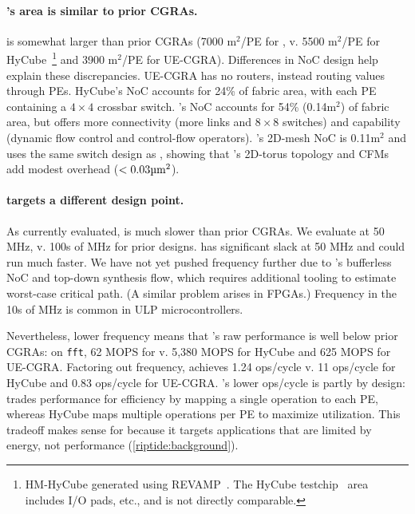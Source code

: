 \paragraph{\riptide's area is similar to prior CGRAs.}
\riptide is somewhat larger than prior CGRAs
(7000 \textmu m$^2$/PE for \riptide, v.
5500 \textmu m$^2$/PE for HyCube~\cite{revamp}\footnote{HM-HyCube generated using REVAMP~\cite{revamp}. The HyCube testchip~\cite{wang2019hycube} area includes I/O pads, etc., and is not directly comparable.}
and 3900 \textmu m$^2$/PE for UE-CGRA).
% 
Differences in NoC design help explain these discrepancies.
%
UE-CGRA has no routers, instead routing values through PEs.
%
% 
HyCube's NoC accounts for 24\% of fabric area, with each PE containing a $4\times4$ crossbar switch.
% 
\riptide's NoC accounts for 54\% (0.14\textmu m$^2$) of fabric area, but offers more connectivity (more links and $8\times8$ switches) and capability (dynamic flow control and control-flow operators).
%
\snafu's 2D-mesh NoC is 0.11\textmu m$^2$ and uses the same switch design as \riptide, showing that \riptide's 2D-torus topology and CFMs add modest overhead ($<0.03\text{\textmu m}^2$).

\paragraph{\riptide targets a different design point.}
As currently evaluated, \riptide is much slower than prior CGRAs.
%
We evaluate \riptide at 50 MHz,
v. 100s of MHz for prior designs.
%
\riptide has significant slack at 50 MHz
and could run much faster.
%
We have not yet pushed frequency further
due to \riptide's bufferless NoC
and top-down synthesis flow,
which requires additional tooling to
estimate worst-case critical path.
(A similar problem arises in FPGAs.)
%
Frequency in the 10s of MHz is
common in ULP microcontrollers.

Nevertheless, lower frequency means that \riptide's raw performance is well below prior CGRAs:
%
on {\tt fft}, 62 MOPS for \riptide v. 5,380 MOPS for HyCube
and 625 MOPS for UE-CGRA.
%
Factoring out frequency, \riptide achieves 1.24 ops/cycle
v. 11 ops/cycle for HyCube
and 0.83 ops/cycle for UE-CGRA.
%
\riptide's lower ops/cycle is partly by design:
\riptide trades performance for efficiency by mapping a single operation to each PE,
whereas HyCube maps multiple operations per PE to maximize utilization.
%
This tradeoff makes sense for \riptide
because it targets applications
that are limited by energy, not performance (\autoref{riptide:background}).

